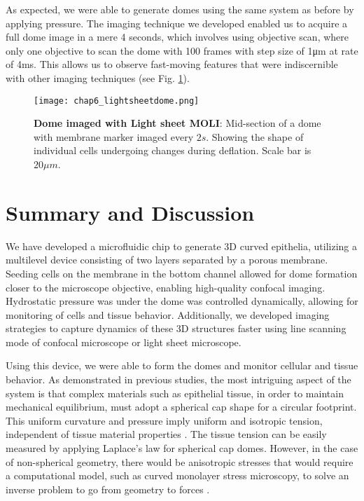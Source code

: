 As expected, we were able to generate domes using the same system as before by applying pressure. The imaging technique we developed enabled us to acquire a full dome image in a mere 4 seconds, which involves using objective scan, where only one objective to scan the dome with 100 frames with step size of 1\unit{\um} at rate of 4\unit{\ms}. This allows us to observe fast-moving features that were indiscernible with other imaging techniques (see Fig. \ref{fig_6_9}).

\begin{figure}[]
	\centering
	\texttt{[image: chap6\_lightsheetdome.png]}
	\caption{ \textbf{Dome imaged with Light sheet MOLI}: Mid-section of a dome with membrane marker imaged every $2s$. Showing the shape of individual cells undergoing changes during deflation. Scale bar is $20 \mu m$.
	}\label{fig_6_9}
\end{figure}

\hypertarget{summary-and-discussion}{%
\section{Summary and Discussion}\label{summary-and-discussion}}

We have developed a microfluidic chip to generate 3D curved epithelia, utilizing a multilevel device consisting of two layers separated by a porous membrane. Seeding cells on the membrane in the bottom channel allowed for dome formation closer to the microscope objective, enabling high-quality confocal imaging. Hydrostatic pressure was under the dome was controlled dynamically, allowing for monitoring of cells and tissue behavior. Additionally, we developed imaging strategies to capture dynamics of these 3D structures faster using line scanning mode of confocal microscope or light sheet microscope.

Using this device, we were able to form the domes and monitor cellular and tissue behavior. As demonstrated in previous studies, the most intriguing aspect of the system is that complex materials such as epithelial tissue, in order to maintain mechanical equilibrium, must adopt a spherical cap shape for a circular footprint. This uniform curvature and pressure imply uniform and isotropic tension, independent of tissue material properties \cite{latorre2018,marin-llaurado2022}. The tissue tension can be easily measured by applying Laplace's law for spherical cap domes. However, in the case of non-spherical geometry, there would be anisotropic stresses that would require a computational model, such as curved monolayer stress microscopy, to solve an inverse problem to go from geometry to forces \cite{marin-llaurado2022}.  

